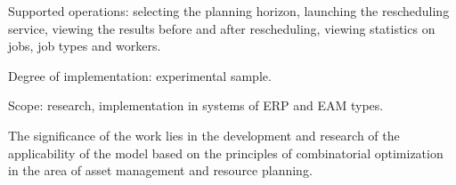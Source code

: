 Supported operations: selecting the planning horizon, launching the rescheduling service, viewing the results before and after rescheduling, viewing statistics on jobs, job types and workers.

Degree of implementation: experimental sample.

Scope: research, implementation in systems of ERP and EAM types.

The significance of the work lies in the development and research of the applicability of the model based on the principles of combinatorial optimization in the area of asset management and resource planning.

\clearpage
